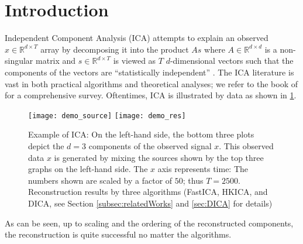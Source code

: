 \documentclass[twoside,11pt]{article}
\newcommand{\real}{\mathbb{R}}
\newcommand{\iid}{i.i.d.\xspace}
\begin{document}
\section{Introduction}
\label{sec:Intro}
Independent Component Analysis (ICA) attempts to explain an observed $x\in \real^{d\times T}$ array by decomposing it into the product $As$ where $A\in \real^{d\times d}$ is a non-singular matrix and $s\in \real^{d\times T}$ is viewed as $T$ $d$-dimensional vectors such that the components of the vectors are ``statistically independent'' \citep{HyKaOj01}.
The ICA literature is vast in both practical algorithms and theoretical analyses; 
we refer to the book of \citet{comon2010handbook} for a comprehensive survey.
Oftentimes, ICA is illustrated by data as shown in \ref{fig:demo}. 
\begin{figure}[t]
\centering
	\texttt{[image: demo\_source]}
	\texttt{[image: demo\_res]}
\caption{Example of ICA: On the left-hand side, the bottom three plots depict the $d=3$ components of the observed signal $x$. 
This observed data $x$ is generated by mixing the sources shown by the top three graphs on the left-hand side.
The $x$ axis represents time: The numbers shown are scaled by a factor of $50$; thus $T=2500$.
Reconstruction results by three algorithms (FastICA, HKICA, and DICA, see Section \ref{subsec:relatedWorks} and \ref{sec:DICA} for details)}
\label{fig:demo}
\end{figure}
As can be seen, 
up to scaling and the ordering of the reconstructed components, the reconstruction is quite successful no matter the algorithms.
\end{document}
